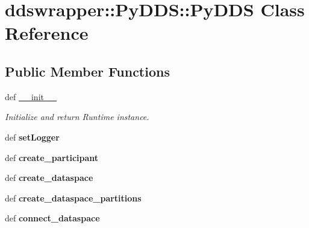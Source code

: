 \hypertarget{classddswrapper_1_1_py_d_d_s_1_1_py_d_d_s}{
\section{ddswrapper::PyDDS::PyDDS Class Reference}
\label{classddswrapper_1_1_py_d_d_s_1_1_py_d_d_s}
}
\subsection*{Public Member Functions}
\begin{DoxyCompactItemize}
\item 
\hypertarget{classddswrapper_1_1_py_d_d_s_1_1_py_d_d_s_aede881a27cd85be874e6f777b19ee070}{
def \hyperlink{classddswrapper_1_1_py_d_d_s_1_1_py_d_d_s_aede881a27cd85be874e6f777b19ee070}{\_\-\_\-init\_\-\_\-}}
\label{classddswrapper_1_1_py_d_d_s_1_1_py_d_d_s_aede881a27cd85be874e6f777b19ee070}

\begin{DoxyCompactList}\small\item\em Initialize and return Runtime instance. \end{DoxyCompactList}\item 
\hypertarget{classddswrapper_1_1_py_d_d_s_1_1_py_d_d_s_a8c398f177d21473bc6f935dbf01c8dd0}{
def {\bfseries setLogger}}
\label{classddswrapper_1_1_py_d_d_s_1_1_py_d_d_s_a8c398f177d21473bc6f935dbf01c8dd0}

\item 
\hypertarget{classddswrapper_1_1_py_d_d_s_1_1_py_d_d_s_a7ee21a27d3c131eda1e60e21f8d6de6b}{
def {\bfseries create\_\-participant}}
\label{classddswrapper_1_1_py_d_d_s_1_1_py_d_d_s_a7ee21a27d3c131eda1e60e21f8d6de6b}

\item 
\hypertarget{classddswrapper_1_1_py_d_d_s_1_1_py_d_d_s_a949e143a53bfe3924d736cb8b9276857}{
def {\bfseries create\_\-dataspace}}
\label{classddswrapper_1_1_py_d_d_s_1_1_py_d_d_s_a949e143a53bfe3924d736cb8b9276857}

\item 
\hypertarget{classddswrapper_1_1_py_d_d_s_1_1_py_d_d_s_a1eca71dbb3e643a1e823f8d4c9cc6ac8}{
def {\bfseries create\_\-dataspace\_\-partitions}}
\label{classddswrapper_1_1_py_d_d_s_1_1_py_d_d_s_a1eca71dbb3e643a1e823f8d4c9cc6ac8}

\item 
\hypertarget{classddswrapper_1_1_py_d_d_s_1_1_py_d_d_s_a66076a4fbf2e9b47cdb113ff8cb25ec0}{
def {\bfseries connect\_\-dataspace}}
\label{classddswrapper_1_1_py_d_d_s_1_1_py_d_d_s_a66076a4fbf2e9b47cdb113ff8cb25ec0}


\end{DoxyCompactItemize}
